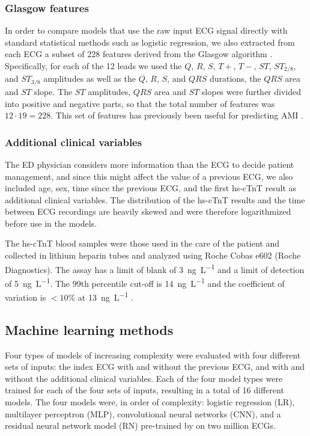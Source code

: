 \documentclass[preprint]{elsarticle}
\begin{document}
\subsubsection{Glasgow features}
\label{sec:glasgow}
In order to compare models that use the raw input ECG signal directly with standard statistical methods such as logistic regression, we also extracted from each ECG a subset of 228 features derived from the Glasgow algorithm \citep{macfarlane2005}. Specifically, for each of the 12 leads we used the $Q$, $R$, $S$, $T+$, $T-$, $ST$, $ST_{2/8}$, and $ST_{3/8}$ amplitudes as well as the $Q$, $R$, $S$, and $QRS$ durations, the $QRS$ area and $ST$ slope. The $ST$ amplitudes, $QRS$ area and $ST$ slopes were further divided into positive and negative parts, so that the total number of features was $12 \cdot 19=228$. This set of features has previously been useful for predicting AMI \citep{forberg2009}.

\subsubsection{Additional clinical variables}
The ED physician considers more information than the ECG to decide patient management, and since this might affect the value of a previous ECG, we also included age, sex, time since the previous ECG, and the first hs-cTnT result as additional clinical variables. The distribution of the hs-cTnT results and the time between ECG recordings are heavily skewed and were therefore logarithmized before use in the models. 

The hs-cTnT blood samples were those used in the care of the patient and collected in lithium heparin tubes and analyzed using Roche Cobas e602 (Roche Diagnostics). The assay has a limit of blank of \SI{3}{\nano\gram\per\liter} and a limit of detection of \SI{5}{\nano\gram\per\liter}. The 99th percentile cut-off is \SI{14}{\nano\gram\per\liter} and the coefficient of variation is $<10\%$ at \SI{13}{\nano\gram\per\liter} \citep{giannitsis2010}.


\subsection{Machine learning methods}
Four types of models of increasing complexity were evaluated with four different sets of inputs: the index ECG with and without the previous ECG, and with and without the additional clinical variables. Each of the four model types were trained for each of the four sets of inputs, resulting in a total of 16 different models. The four models were, in order of complexity: logistic regression (LR), multilayer perceptron (MLP), convolutional neural networks (CNN), and a residual neural network model (RN) pre-trained by \citet{ribeiro2020} on two million ECGs.
\end{document}
